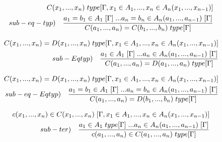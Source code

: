 \[
\begin{split}
C(x_1,...,x_n)\hspace{0.1cm}type[\Gamma, x_1 \in A_1,...,x_n \in A_n(x_1,...,x_{n-1})] \\ sub-eq-typ) \quad \frac{a_1 = b_1  \in A_1\hspace{0.1cm}[\Gamma]\hspace{0.1cm}...a_n = b_n \in A_n(a_1,...,a_{n-1})\hspace{0.1cm}[\Gamma]}{C(a_1,...,a_n) = C(b_1,...,b_n) \hspace{0.1cm}type[\Gamma]}
\end{split}
\]

\[
\begin{split}
C(x_1,...,x_n) = D(x_1,...,x_n) \hspace{0.1cm}type[\Gamma, x_1 \in A_1,...,x_n \in A_n(x_1,...,x_{n-1})] \\ sub-Eqtyp) \quad \frac{a_1 \in A_1\hspace{0.1cm}[\Gamma]\hspace{0.1cm}...a_n \in A_n(a_1,...,a_{n-1})\hspace{0.1cm}[\Gamma]}{C(a_1,...,a_n) = D(a_1,...,a_n)\hspace{0.1cm}type[\Gamma]}
\end{split}
\]

\[
\begin{split}
C(x_1,...,x_n) = D(x_1,...,x_n) \hspace{0.1cm}type[\Gamma, x_1 \in A_1,...,x_n \in A_n(x_1,...,x_{n-1})] \\ sub-eq-Eqtyp) \quad \frac{a_1 = b_1\in A_1\hspace{0.1cm}[\Gamma]\hspace{0.1cm}...a_n = b_n \in A_n(a_1,...,a_{n-1})\hspace{0.1cm}[\Gamma]}{C(a_1,...,a_n) = D(b_1,...,b_n)\hspace{0.1cm}type[\Gamma]}
\end{split}
\]

\[
\begin{split}
c(x_1,...,x_n) \in C(x_1,...,x_n) \hspace{0.1cm}[\Gamma, x_1 \in A_1,...,x_n \in A_n(x_1,...,x_{n-1})] \\ sub-ter) \quad \frac{a_1 \in A_1\hspace{0.1cm}type[\Gamma]\hspace{0.1cm}...a_n \in A_n(a_1,...,a_{n-1})\hspace{0.1cm}[\Gamma]}{ c(a_1,...,a_n) \in C(a_1,...,a_n)\hspace{0.1cm}type[\Gamma]}
\end{split}
\]

